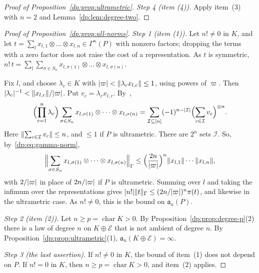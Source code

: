 \begin{proof}[Proof of Proposition~\ref{dp:prop:ultrametric}]
\emph{Step 4 (item (4)).} Apply item~(3) with $n=2$ and Lemma~\ref{dp:lem:degree-two}.
\end{proof}

\begin{proof}[Proof of Proposition~\ref{dp:prop:all-norms}]
\emph{Step 1 (item (1)).} Let $n!\ne0$ in $K$, and let $t=\sum_lx_{l,1}\otimes\dots\otimes x_{l,n}\in\Gamma^n(P)$ with nonzero factors; dropping the terms with a zero factor does not raise the cost of a representation. As $t$ is symmetric, $n!\,t=\sum_l\sum_{\sigma\in S_n}x_{l,\sigma(1)}\otimes\dots\otimes x_{l,\sigma(n)}$.

Fix $l$, and choose $\lambda_c\in K$ with $\lvert \varpi\rvert<\lVert \lambda_cx_{l,c}\rVert\le1$, using powers of $\varpi$. Then $\lvert \lambda_c\rvert^{-1}<\lVert x_{l,c}\rVert/\lvert \varpi\rvert$. Put $v_c=\lambda_cx_{l,c}$. By~\cite[(4.2)]{I},
\[
 \Bigl(\prod_{c=1}^n\lambda_c\Bigr)\sum_{\sigma\in S_n}x_{l,\sigma(1)}\otimes\dots\otimes x_{l,\sigma(n)}
 =\sum_{\mathcal I\subseteq[n]}(-1)^{n-\lvert \mathcal I\rvert}\Bigl(\sum_{c\in\mathcal I}v_c\Bigr)^{\otimes n}.
\]
Here $\lVert \sum_{c\in\mathcal I}v_c\rVert\le n$, and $\le1$ if $P$ is ultrametric. There are $2^n$ sets $\mathcal I$. So, by~\eqref{dp:eq:gamma-norm},
\[
 \Bigl\|\sum_{\sigma\in S_n}x_{l,\sigma(1)}\otimes\dots\otimes x_{l,\sigma(n)}\Bigr\|_\Gamma
 \le\Bigl(\frac{2n}{\lvert \varpi\rvert}\Bigr)^n\lVert x_{l,1}\rVert\cdots\lVert x_{l,n}\rVert,
\]
with $2/\lvert \varpi\rvert$ in place of $2n/\lvert \varpi\rvert$ if $P$ is ultrametric. Summing over $l$ and taking the infimum over the representations gives $\lvert n!\rvert\lVert t\rVert_\Gamma\le(2n/\lvert \varpi\rvert)^n\pi(t)$, and likewise in the ultrametric case. As $n!\ne0$, this is the bound on $\mathfrak a_n(P)$.

\emph{Step 2 (item (2)).} Let $n\ge p=\operatorname{char}K>0$. By Proposition~\ref{dp:prop:degree-p}(2) there is a law of degree $n$ on $K\oplus\mathcal E$ that is not ambient of degree $n$. By Proposition~\ref{dp:prop:ultrametric}(1), $\mathfrak a_n(K\oplus\mathcal E)=\infty$.

\emph{Step 3 (the last assertion).} If $n!\ne0$ in $K$, the bound of item~(1) does not depend on $P$. If $n!=0$ in $K$, then $n\ge p=\operatorname{char}K>0$, and item~(2) applies.
\end{proof}
